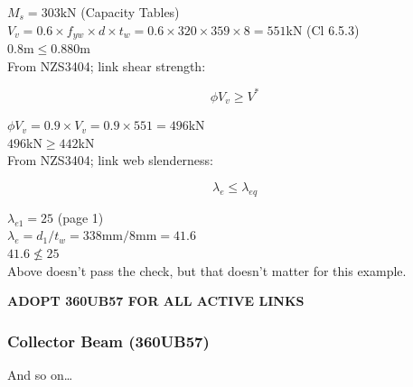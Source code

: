 \documentclass[12pt,a4paper]{article} %
\newcommand{\tab}{\hspace*{2em}} %
\begin{document}
\tab $M_s=303\mathrm{kN}$ (Capacity Tables) \\[8pt]
\tab $V_v=0.6 \times f_{yw} \times d \times t_w = 0.6 \times 320 \times 359 \times 8 = 551$kN (Cl 6.5.3) \\[8pt]
\tab $0.8$m$\leqslant0.880$m  \\

From NZS3404; link shear strength:

\begin{equation*}
\tag{Cl 6.5.3}
\phi V_v \geqslant V^*
\end{equation*}

\tab $\phi V_v=0.9\times V_v=0.9\times551=496$kN \\[8pt]
\tab $496$kN$\geqslant442$kN  \\

From NZS3404; link web slenderness:

\begin{equation*}
\tag{Cl 12.8.3}
\lambda_e \leqslant \lambda_{eq}
\end{equation*}

\tab $\lambda_{e1}=25$ (page 1) \\[8pt]
\tab $\lambda_e=d_1/t_w=338$mm$/8$mm$=41.6$ \\[8pt]
\tab $41.6 \nleqslant 25$  \\

Above doesn't pass the check, but that doesn't matter for this example.
\par\vspace{\baselineskip}

\begin{center}
\textbf{ADOPT 360UB57 FOR ALL ACTIVE LINKS} \\
\end{center}

\subsubsection{Collector Beam (360UB57)}
And so on\dots

\end{document}
